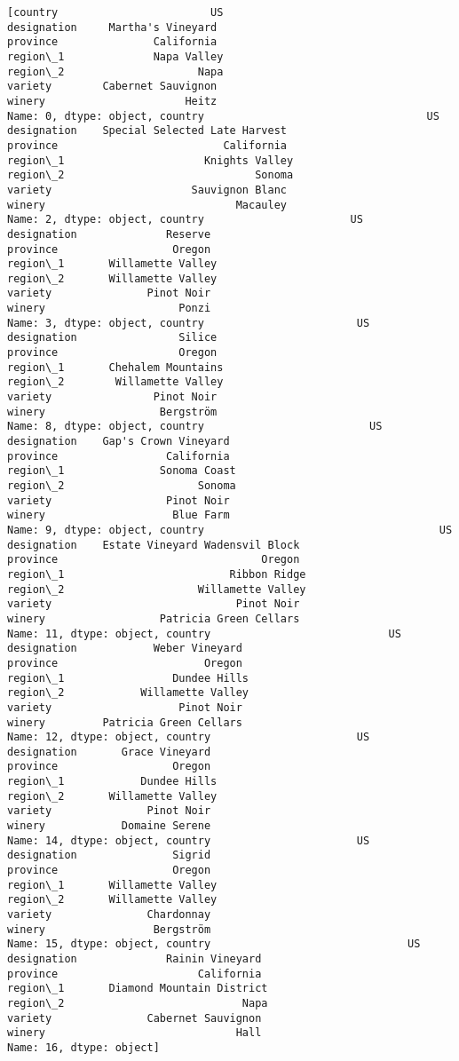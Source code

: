 \documentclass[11pt]{article}
\begin{document}
    \begin{Verbatim}[commandchars=\\\{\}]
[country                        US
designation     Martha's Vineyard
province               California
region\_1              Napa Valley
region\_2                     Napa
variety        Cabernet Sauvignon
winery                      Heitz
Name: 0, dtype: object, country                                   US
designation    Special Selected Late Harvest
province                          California
region\_1                      Knights Valley
region\_2                              Sonoma
variety                      Sauvignon Blanc
winery                              Macauley
Name: 2, dtype: object, country                       US
designation              Reserve
province                  Oregon
region\_1       Willamette Valley
region\_2       Willamette Valley
variety               Pinot Noir
winery                     Ponzi
Name: 3, dtype: object, country                        US
designation                Silice
province                   Oregon
region\_1       Chehalem Mountains
region\_2        Willamette Valley
variety                Pinot Noir
winery                  Bergström
Name: 8, dtype: object, country                          US
designation    Gap's Crown Vineyard
province                 California
region\_1               Sonoma Coast
region\_2                     Sonoma
variety                  Pinot Noir
winery                    Blue Farm
Name: 9, dtype: object, country                                     US
designation    Estate Vineyard Wadensvil Block
province                                Oregon
region\_1                          Ribbon Ridge
region\_2                     Willamette Valley
variety                             Pinot Noir
winery                  Patricia Green Cellars
Name: 11, dtype: object, country                            US
designation            Weber Vineyard
province                       Oregon
region\_1                 Dundee Hills
region\_2            Willamette Valley
variety                    Pinot Noir
winery         Patricia Green Cellars
Name: 12, dtype: object, country                       US
designation       Grace Vineyard
province                  Oregon
region\_1            Dundee Hills
region\_2       Willamette Valley
variety               Pinot Noir
winery            Domaine Serene
Name: 14, dtype: object, country                       US
designation               Sigrid
province                  Oregon
region\_1       Willamette Valley
region\_2       Willamette Valley
variety               Chardonnay
winery                 Bergström
Name: 15, dtype: object, country                               US
designation              Rainin Vineyard
province                      California
region\_1       Diamond Mountain District
region\_2                            Napa
variety               Cabernet Sauvignon
winery                              Hall
Name: 16, dtype: object]
    \end{Verbatim}
\end{document}
